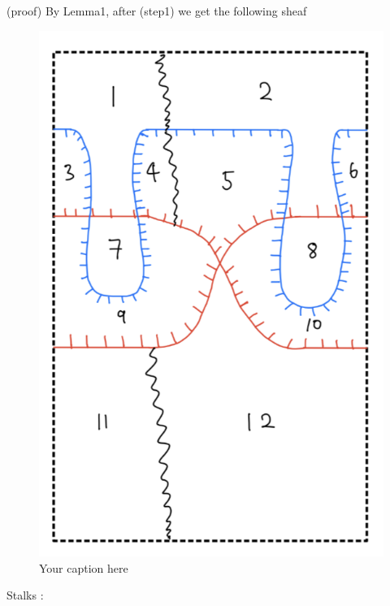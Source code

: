(proof) By Lemma1, after (step1) we get the following sheaf
\begin{figure}[H] %
    \centering
    \includegraphics[scale = 0.95]{diagrams/lemma10/15.png} %
    \caption{Your caption here}
    \label{fig:your-label}
\end{figure}

Stalks :\\